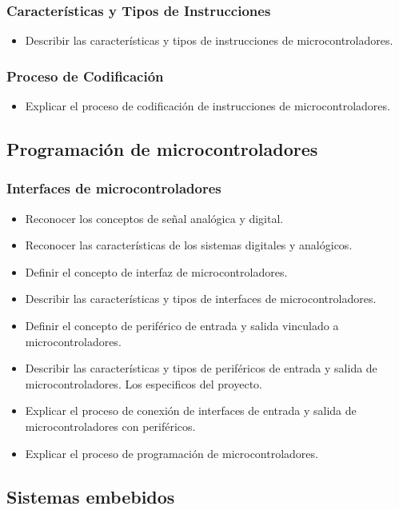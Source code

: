\documentclass[a4paper,12pt]{article}
\begin{document}
	\subsubsection{Características y Tipos de Instrucciones}
	\begin{itemize}
		\item Describir las características y tipos de instrucciones de microcontroladores.
	\end{itemize}
	\subsubsection{Proceso de Codificación}
	\begin{itemize}
		\item Explicar el proceso de codificación de instrucciones de microcontroladores.
	\end{itemize}
	
	\subsection{Programación de microcontroladores}
	\subsubsection{Interfaces de microcontroladores}
	\begin{itemize}
		\item Reconocer los conceptos de señal analógica y digital.
		\item Reconocer las características de los sistemas digitales y analógicos.
		\item Definir el concepto de interfaz de microcontroladores.
		\item Describir las características y tipos de interfaces de microcontroladores.
		\item Definir el concepto de periférico de entrada y salida vinculado a microcontroladores.
		\item Describir las características y tipos de periféricos de entrada y salida de microcontroladores. Los especificos del proyecto.
		\item Explicar el proceso de conexión de interfaces de entrada y salida de microcontroladores con periféricos.
		\item Explicar el proceso de programación de microcontroladores.
	\end{itemize}
	
	\subsection{Sistemas embebidos}
\end{document}
